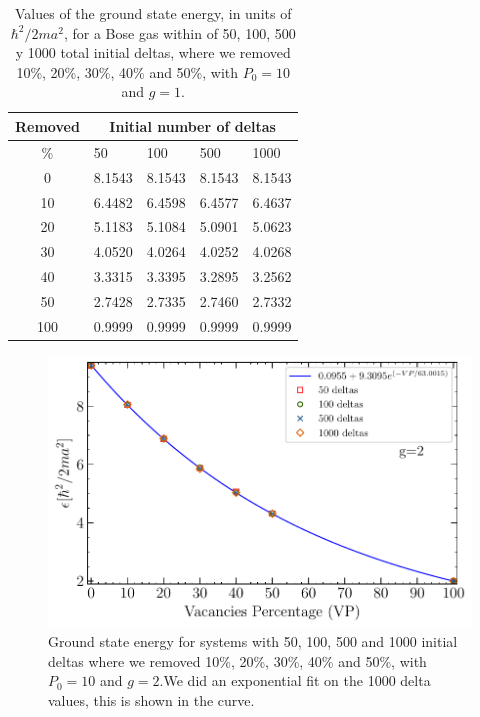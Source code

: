 \documentclass[twocolumn,showpacs,showkeys,preprintnumbers,superscriptaddress, pra, 10pt, aps]{revtex4-2}
\begin{document}
\begin{table}[H]
  \begin{center}
    \begin{tabular}{c|llll}
      \toprule
      Removed & \multicolumn{4}{c}{Initial number of deltas}                            \\
      \midrule
      \%      & 50                                           & 100    & 500    & 1000   \\ \hline
      0       & 8.1543                                       & 8.1543 & 8.1543 & 8.1543 \\
      10      & 6.4482                                       & 6.4598 & 6.4577 & 6.4637 \\
      20      & 5.1183                                       & 5.1084 & 5.0901 & 5.0623 \\
      30      & 4.0520                                       & 4.0264 & 4.0252 & 4.0268 \\
      40      & 3.3315                                       & 3.3395 & 3.2895 & 3.2562 \\
      50      & 2.7428                                       & 2.7335 & 2.7460 & 2.7332 \\
      100     & 0.9999                                       & 0.9999 & 0.9999 & 0.9999 \\
      \bottomrule
    \end{tabular}
    \caption{Values of the ground state energy, in units of $\hbar^2/2ma^2$, for a Bose gas within of  50, 100, 500 y 1000 total initial deltas, where we removed  10\%, 20\%, 30\%, 40\% and 50\%, with $P_0 = 10$ and $g=1$.}
    \label{table:tabla2}
  \end{center}%
\end{table}


\begin{figure}[H]
  \centering
  \includegraphics[width=\linewidth]{g2.pdf}
  \caption{Ground state energy for systems with 50, 100, 500 and 1000 initial deltas where we removed
    10\%, 20\%, 30\%, 40\% and 50\%, with $P_0=10$ and $g=2$.We did an exponential fit on the 1000 delta values, this is shown in the curve.}%
  \label{fig:Energiasg2}
\end{figure}
\end{document}
